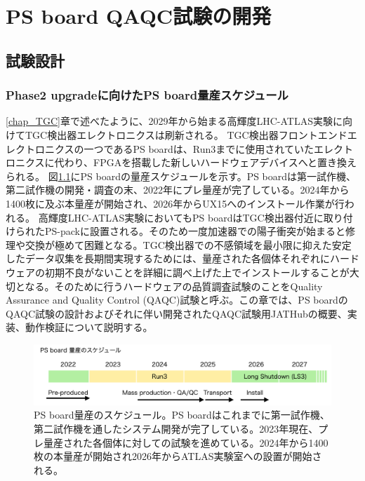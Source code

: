 \chapter{PS board QAQC試験の開発}
\label{chap_QAQC}

\section{試験設計}
\label{sec_QAQCdesign}
\subsection{Phase2 upgradeに向けたPS board量産スケジュール}
\label{subsec_PSBschedule}
\ref{chap_TGC}章で述べたように、2029年から始まる高輝度LHC-ATLAS実験に向けてTGC検出器エレクトロニクスは刷新される。
TGC検出器フロントエンドエレクトロニクスの一つであるPS boardは、Run3までに使用されていたエレクトロニクスに代わり、FPGAを搭載した新しいハードウェアデバイスへと置き換えられる。
図\ref{PSBschedule}にPS boardの量産スケジュールを示す。PS boardは第一試作機、第二試作機の開発・調査の末、2022年にプレ量産が完了している。2024年から1400枚に及ぶ本量産が開始され、2026年からUX15へのインストール作業が行われる。
高輝度LHC-ATLAS実験においてもPS boardはTGC検出器付近に取り付けられたPS-packに設置される。そのため一度加速器での陽子衝突が始まると修理や交換が極めて困難となる。TGC検出器での不感領域を最小限に抑えた安定したデータ収集を長期間実現するためには、量産された各個体それぞれにハードウェアの初期不良がないことを詳細に調べ上げた上でインストールすることが大切となる。そのために行うハードウェアの品質調査試験のことをQuality Assurance and Quality Control (QAQC)試験と呼ぶ。この章では、PS boardのQAQC試験の設計およびそれに伴い開発されたQAQC試験用JATHubの概要、実装、動作検証について説明する。

\begin{figure} 
\centering
\includegraphics[width=16cm]{fig/QAQC/PSBschedule.png}
\caption[PS board量産のスケジュール]{PS board量産のスケジュール。PS boardはこれまでに第一試作機、第二試作機を通したシステム開発が完了している。2023年現在、プレ量産された各個体に対しての試験を進めている。2024年から1400枚の本量産が開始され2026年からATLAS実験室への設置が開始される。}
\label{PSBschedule}
\end{figure}

